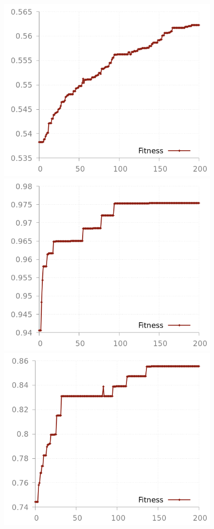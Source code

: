 \documentclass[preprint,12pt]{elsarticle}
\theoremstyle{definition}
\begin{document}
\begin{figure}[!h]\centering
\includegraphics[scale=0.2]{img/fitness_mcc_adult.png}
\hfill
\includegraphics[scale=0.2]{img/fitness_mcc_breast.png}
\hfill
\includegraphics[scale=0.2]{img/fitness_mcc_heart.png}

\end{figure}
\end{document}
